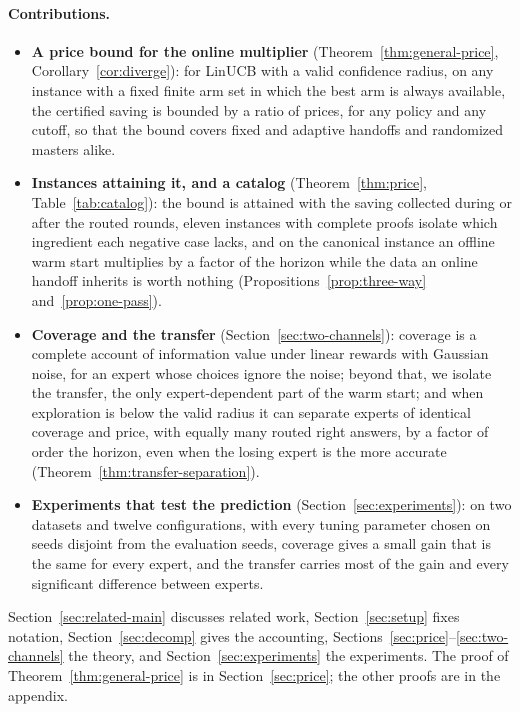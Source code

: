\documentclass{article}
\theoremstyle{definition}
\theoremstyle{remark}
\theoremstyle{remark}
\begin{document}
\paragraph{Contributions.}
\begin{itemize}[itemsep=1pt, topsep=1pt, leftmargin=*]
\item \textbf{A price bound for the online multiplier}
(Theorem~\ref{thm:general-price}, Corollary~\ref{cor:diverge}): for LinUCB
with a valid confidence radius, on any instance with a fixed finite arm set in
which the best arm is always available, the certified saving is bounded by a
ratio of prices, for any policy and any cutoff, so that the bound covers fixed
and adaptive handoffs and randomized masters alike.
\item \textbf{Instances attaining it, and a catalog}
(Theorem~\ref{thm:price}, Table~\ref{tab:catalog}): the bound is attained
with the saving collected during or after the routed rounds, eleven instances
with complete proofs isolate which ingredient each negative case lacks, and
on the canonical instance an offline warm start multiplies by a factor of the
horizon while the data an online handoff inherits is worth nothing
(Propositions~\ref{prop:three-way} and~\ref{prop:one-pass}).
\item \textbf{Coverage and the transfer} (Section~\ref{sec:two-channels}):
coverage is a complete account of information value under linear rewards
with Gaussian noise, for an expert whose choices ignore the noise; beyond
that, we isolate the transfer, the only expert-dependent part of the warm
start; and when exploration is below the valid radius it can separate experts
of identical coverage and price, with equally many routed right answers, by a
factor of order the horizon, even when the losing expert is the more accurate
(Theorem~\ref{thm:transfer-separation}).
\item \textbf{Experiments that test the prediction}
(Section~\ref{sec:experiments}): on two datasets and twelve configurations,
with every tuning parameter chosen on seeds disjoint from the evaluation
seeds, coverage gives a small gain that is the same for every expert, and the
transfer carries most of the gain and every significant difference between
experts.
\end{itemize}
Section~\ref{sec:related-main} discusses related work,
Section~\ref{sec:setup} fixes notation, Section~\ref{sec:decomp} gives the
accounting, Sections~\ref{sec:price}--\ref{sec:two-channels} the theory, and
Section~\ref{sec:experiments} the experiments. The proof of
Theorem~\ref{thm:general-price} is in Section~\ref{sec:price}; the other proofs
are in the appendix.
\end{document}

